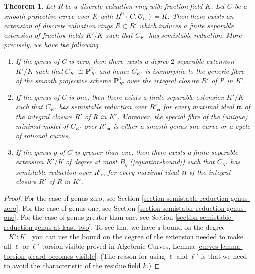 \documentclass{stacks-project}
\newenvironment{reference}{\comment}{\endcomment}
\theoremstyle{plain}
\newtheorem{theorem}[subsection]{Theorem}
\theoremstyle{definition}
\theoremstyle{remark}
\numberwithin{equation}{subsection}
\begin{document}
\begin{theorem}
\label{theorem-semistable-reduction}
\begin{reference}
\cite[Corollary 2.7]{DM}
\end{reference}
Let $R$ be a discrete valuation ring with fraction field $K$. Let $C$ be a
smooth projective curve over $K$ with $H^0(C, \mathcal{O}_C) = K$.
Then there exists an extension of discrete valuation rings
$R \subset R'$ which induces a finite separable extension of
fraction fields $K'/K$ such that $C_{K'}$ has semistable reduction.
More precisely, we have the following
\begin{enumerate}
\item If the genus of $C$ is zero, then there exists a degree $2$
separable extension $K'/K$ such that $C_{K'} \cong \mathbf{P}^1_{K'}$
and hence $C_{K'}$ is isomorphic to the generic fibre of the
smooth projective scheme $\mathbf{P}^1_{R'}$ over the integral closure
$R'$ of $R$ in $K'$.
\item If the genus of $C$ is one, then there exists a finite separable
extension $K'/K$ such that $C_{K'}$ has semistable reduction
over $R'_\mathfrak m$ for every maximal ideal $\mathfrak m$
of the integral closure $R'$ of $R$ in $K'$. Moreover, the special
fibre of the (unique) minimal model of $C_{K'}$ over $R'_\mathfrak m$
is either a smooth genus one curve or a cycle of rational curves.
\item If the genus $g$ of $C$ is greater than one, then there exists a
finite separable extension $K'/K$ of degree at most
$B_g$ (\ref{equation-bound}) such that $C_{K'}$ has semistable reduction
over $R'_\mathfrak m$ for every maximal ideal $\mathfrak m$
of the integral closure $R'$ of $R$ in $K'$.
\end{enumerate}
\end{theorem}

\begin{proof}
For the case of genus zero, see
Section \ref{section-semistable-reduction-genus-zero}.
For the case of genus one, see
Section \ref{section-semistable-reduction-genus-one}.
For the case of genus greater than one, see
Section \ref{section-semistable-reduction-genus-at-least-two}.
To see that we have a bound on the degree $[K' : K]$
you can use the bound on the degree of the extension needed
to make all $\ell$ or $\ell'$ torsion visible proved in
Algebraic Curves, Lemma \ref{curves-lemma-torsion-picard-becomes-visible}.
(The reason for using $\ell$ and $\ell'$ is that we need to
avoid the characteristic of the residue field $k$.)
\end{proof}
\end{document}
